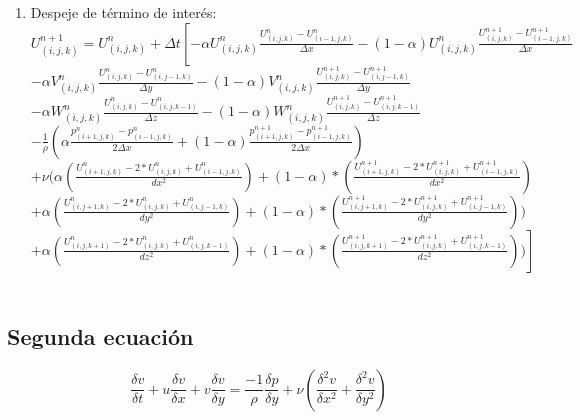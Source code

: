 \documentclass[a4paper]{article}
\begin{document}
\begin{enumerate}
\item Despeje de término de interés:
~\\
$ {U}^{n+1}_{(i,j,k)} = U^{n}_{(i,j,k)} + \Delta t \left[ -  \alpha {U}^{n}_{(i,j,k)} \frac{ {U}^{n}_{(i,j,k)} - U^{n}_{(i-1,j,k)}}{ \Delta x} - (1 - \alpha) {U}^{n}_{(i,j,k)} \frac{ {U}^{n+1}_{(i,j,k)} - U^{n+1}_{(i-1,j,k)}}{ \Delta x} \right.$ 
\\
$- \alpha {V}^{n}_{(i,j,k)} \frac{ {U}^{n}_{(i,j,k)} - U^{n}_{(i,j-1,k)}}{ \Delta y} - (1 - \alpha) {V}^{n}_{(i,j,k)} \frac{ {U}^{n+1}_{(i,j,k)} - U^{n+1}_{(i,j-1,k)}}{ \Delta y}$
\\
$- \alpha {W}^{n}_{(i,j,k)} \frac{ {U}^{n}_{(i,j,k)} - U^{n}_{(i,j,k-1)}}{ \Delta z} - (1 - \alpha) {W}^{n}_{(i,j,k)} \frac{ {U}^{n+1}_{(i,j,k)} - U^{n+1}_{(i,j,k-1)}}{ \Delta z}$
\\
$- \frac{1}{\rho} ( \alpha \frac{p^{n}_{(i+1,j,k)} - p^{n}_{(i-1,j,k)} }{ 2 \Delta x } + (1 - \alpha) \frac{p^{n+1}_{(i+1,j,k)} - p^{n+1}_{(i-1,j,k)} }{ 2 \Delta x })  $
\\
$+ \nu (\alpha (\frac{ U^{n}_{(i+1,j,k)} - 2*U^{n}_{(i,j,k)} + U^{n}_{(i-1,j,k)}}{dx^2}) + (1-\alpha)*(\frac{ U^{n+1}_{(i+1,j,k)} - 2*U^{n+1}_{(i,j,k)} + U^{n+1}_{(i-1,j,k)}}{dx^2})$
\\
$+ \alpha (\frac{ U^{n}_{(i,j+1,k)} - 2*U^{n}_{(i,j,k)} + U^{n}_{(i,j-1,k)}}{dy^2}) + (1-\alpha)*(\frac{ U^{n+1}_{(i,j+1,k)} - 2*U^{n+1}_{(i,j,k)} + U^{n+1}_{(i,j-1,k)}}{dy^2}))$
\\
$ \left.+ \alpha (\frac{ U^{n}_{(i,j,k+1)} - 2*U^{n}_{(i,j,k)} + U^{n}_{(i,j,k-1)}}{dz^2}) + (1-\alpha)*(\frac{ U^{n+1}_{(i,j,k+1)} - 2*U^{n+1}_{(i,j,k)} + U^{n+1}_{(i,j,k-1)}}{dz^2})) \right]$
~\\


\end{enumerate}



\subsection{Segunda ecuación}



$$ \frac{\delta v}{\delta t} + u \frac{\delta v}{\delta x} + v \frac{\delta v}{\delta y} =  \frac{-1}{\rho} \frac{\delta p}{\delta y} + \nu (\frac{{\delta}^{2} v}{\delta {x}^{2}} + \frac{{\delta}^{2} v}{\delta {y}^{2}}) $$
\end{document}
